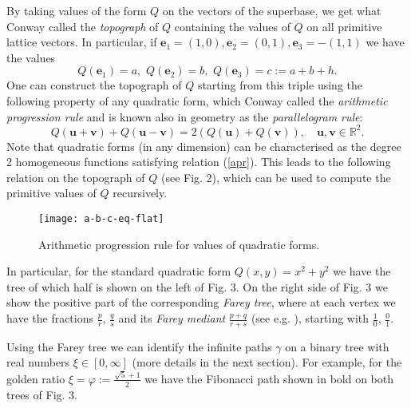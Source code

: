 \documentclass[11pt,reqno]{amsart}
\begin{document}
By taking values of the form $Q$ on the vectors of the superbase, we get what Conway called the {\it topograph} of $Q$ containing the values of $Q$ on all primitive lattice vectors.
In particular, if $\mathbf{e}_1=(1,0), \mathbf{e}_2=(0,1), \mathbf{e}_3=-(1,1)$ we have the values 
$$
Q(\mathbf{e}_1)=a, \,\, Q(\mathbf{e}_2)=b, \,\, Q(\mathbf{e}_3)=c:=a+b+h.
$$
One can construct the topograph of $Q$ starting from this triple using the following property of any quadratic form, which Conway called the {\it arithmetic progression rule} and is known also in geometry as the {\it parallelogram rule}:
\begin{equation}
\label{apr}
Q(\mathbf{u}+\mathbf{v})+Q(\mathbf{u}-\mathbf{v})=2(Q(\mathbf{u})+Q(\mathbf{v})), \quad \mathbf{u},\mathbf{v} \in \mathbb R^2.
\end{equation}
Note that quadratic forms (in any dimension) can be characterised as the degree 2 homogeneous functions satisfying relation (\ref{apr}).
This leads to the following relation on the topograph of $Q$ (see Fig. 2), which can be used to compute the primitive values of $Q$ recursively.
\begin{figure}[h]
	\centering
	\texttt{[image: a-b-c-eq-flat]}
	\caption{Arithmetic progression rule for values of quadratic forms.}
	\end{figure}

In particular, for the standard quadratic form $Q(x,y)=x^2+y^2$ we have the tree of which half is shown on the left of Fig. 3.
On the right side of Fig. 3 we show the positive part of the corresponding {\it Farey tree}, where at each vertex we have the fractions $\frac{p}{r}, \, \frac{q}{s}$ and its {\it Farey mediant}
$\frac{p+q}{r+s}$ (see e.g. \cite{Hatcher,SV}), starting with $\frac{1}{0}, \, \frac{0}{1}.$

Using the Farey tree we can identify the infinite paths $\gamma$ on a binary tree with real numbers $\xi \in [0,\infty]$ (more details in the next section).
For example, for the golden ratio $\xi=\varphi:=\frac{\sqrt{5}+1}{2}$ we have the Fibonacci path shown in bold on both trees of Fig. 3.
\end{document}
